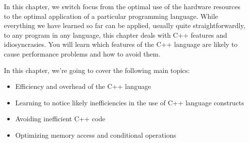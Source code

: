 In this chapter, we switch focus from the optimal use of the hardware resources to the optimal application of a particular programming language. While everything we have learned so far can be applied, usually quite straightforwardly, to any program in any language, this chapter deals with C++ features and idiosyncrasies. You will learn which features of the C++ language are likely to cause performance problems and how to avoid them. 

In this chapter, we’re going to cover the following main topics:

\begin{itemize}
\item
Efficiency and overhead of the C++ language

\item
Learning to notice likely inefficiencies in the use of C++ language constructs

\item
Avoiding inefficient C++ code

\item
Optimizing memory access and conditional operations 
	
\end{itemize}